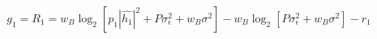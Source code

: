 \documentclass[preview]{standalone}
\begin{document}
\begin{align*}
g_1 = R_1 = w_B \log_2 \left[p_1 \left|\hat{h_1}\right|^2 + P \sigma_{\epsilon}^2 + w_B \sigma^2\right] - w_B \log_2 \left[P \sigma_{\epsilon}^2 + w_B \sigma^2\right] - r_1
\end{align*}
\end{document}

